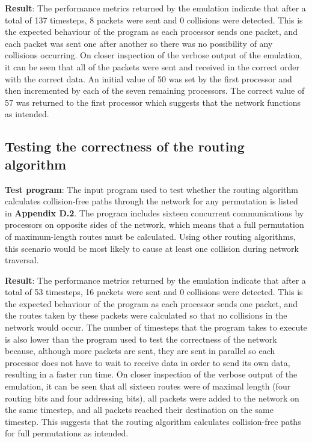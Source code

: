 \documentclass[a4paper, 12pt]{article}
\begin{document}
\noindent\textbf{Result}: The performance metrics returned by the emulation indicate that after a total of 137 timesteps, 8 packets were sent and 0 collisions were detected. This is the expected behaviour of the program as each processor sends one packet, and each packet was sent one after another so there was no possibility of any collisions occurring. On closer inspection of the verbose output of the emulation, it can be seen that all of the packets were sent and received in the correct order with the correct data. An initial value of 50 was set by the first processor and then incremented by each of the seven remaining processors. The correct value of 57 was returned to the first processor which suggests that the network functions as intended. 

\subsection{Testing the correctness of the routing algorithm}

\textbf{Test program}: The input program used to test whether the routing algorithm calculates collision-free paths through the network for any permutation is listed in \textbf{Appendix D.2}. The program includes sixteen concurrent communications by processors on opposite sides of the network, which means that a full permutation of maximum-length routes must be calculated. Using other routing algorithms, this scenario would be most likely to cause at least one collision during network traversal.

\noindent\textbf{Result}: The performance metrics returned by the emulation indicate that after a total of 53 timesteps, 16 packets were sent and 0 collisions were detected. This is the expected behaviour of the program as each processor sends one packet, and the routes taken by these packets were calculated so that no collisions in the network would occur. The number of timesteps that the program takes to execute is also lower than the program used to test the correctness of the network because, although more packets are sent, they are sent in parallel so each processor does not have to wait to receive data in order to send its own data, resulting in a faster run time. On closer inspection of the verbose output of the emulation, it can be seen that all sixteen routes were of maximal length (four routing bits and four addressing bits), all packets were added to the network on the same timestep, and all packets reached their destination on the same timestep. This suggests that the routing algorithm calculates collision-free paths for full permutations as intended.
\end{document}
